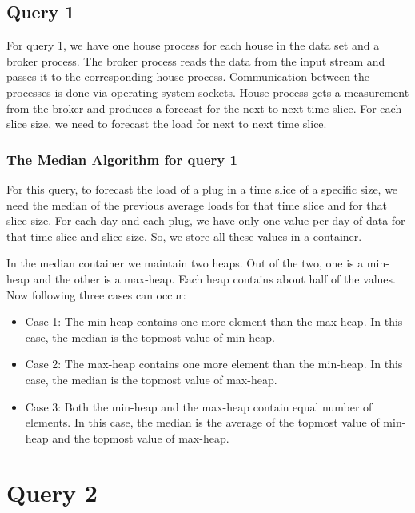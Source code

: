 \subsection{Query 1}
For query 1, we have one house process for each house in the data set and a broker process. The broker process reads the data from the input stream and passes it to the corresponding house process. Communication between the processes is done via operating system sockets. House process gets a measurement from the broker and produces a forecast for the next to next time slice.
For each slice size, we need to forecast the load for next to next time slice.
\subsubsection{The Median Algorithm for query 1}
For this query, to forecast the load of a plug in a time slice of a specific size, we need the median of the previous average loads for that time slice and for that slice size. For each day and each plug, we have only one value per day of data for that time slice and slice size. So, we store all these values in a container.

In the median container we maintain two heaps. Out of the two, one is a min-heap and the other is a max-heap. Each heap contains about half of the values. Now following three cases can occur:
\begin{itemize}
\item Case 1: The min-heap contains one more element than the max-heap. In this case, the median is the topmost value of min-heap.
\item Case 2: The max-heap contains one more element than the min-heap. In this case, the median is the topmost value of max-heap.
\item Case 3: Both the min-heap and the max-heap contain equal number of elements. In this case, the median is the average of the topmost value of min-heap and the topmost value of max-heap.

\end{itemize}

\section{Query 2}


